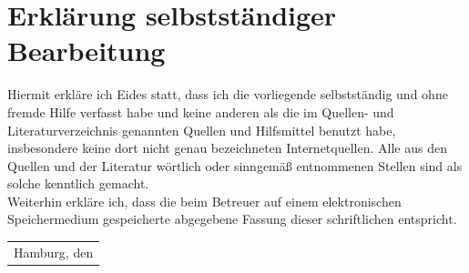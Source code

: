 \section*{Erklärung selbstständiger Bearbeitung}
Hiermit erkläre ich Eides statt, dass ich die vorliegende \theType selbstständig und ohne fremde Hilfe verfasst habe und keine anderen als die im Quellen- und Literaturverzeichnis genannten Quellen und Hilfsmittel benutzt habe, 
insbesondere keine dort nicht genau bezeichneten Internetquellen.
Alle aus den Quellen und der Literatur wörtlich oder sinngemäß entnommenen Stellen sind als solche kenntlich gemacht.\\
Weiterhin erkläre ich,
dass die beim Betreuer auf einem elektronischen Speichermedium gespeicherte abgegebene Fassung dieser schriftlichen entspricht.\par
\vspace{1.5cm}
\begin{tabular}{c}
	\hline
	Hamburg, den \thePruefungstag \\
\end{tabular}
\newpage
